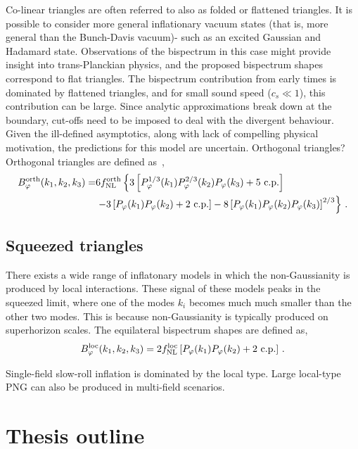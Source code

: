 Co-linear triangles are often referred to also as folded or flattened triangles. It is possible to consider more general inflationary vacuum states (that is, more general than the Bunch-Davis vacuum)- such as an excited Gaussian and Hadamard state. Observations of the bispectrum in this case might provide insight into trans-Planckian physics, and the proposed bispectrum shapes correspond to flat triangles. 
The bispectrum contribution from early times is dominated by flattened triangles, and for small sound speed ($c_s \ll 1$), this contribution can be large. Since analytic approximations break down at the boundary, cut-offs need to be imposed to deal with the divergent behaviour. Given the ill-defined asymptotics, along with lack of compelling physical motivation, the predictions for this model are uncertain.
Orthogonal triangles?~\cite{Senatore:2009gt}
Orthogonal triangles are defined as~\cite{Karagiannis:2018jdt}, 
\begin{align}
	B_\varphi^\mathrm{orth}(k_1,k_2,k_3) =& 6 \fnl^\mathrm{orth} \left\{ \vphantom{\left[ P_\varphi \right]^{1/3}} 3 \left[ P_\varphi^{1/3}(k_1) P_\varphi^{2/3}(k_2) P_\varphi(k_3) + 5\text{ c.p.} \right]  \right. \nonumber \\
	&\left. - 3 \left[ P_\varphi(k_1) P_\varphi(k_2) + 2\text{ c.p.} \right] - 8 \left[ P_\varphi(k_1) P_\varphi(k_2) P_\varphi(k_3) \right]^{2/3} \right\}\,.
\end{align}


\subsection{Squeezed triangles}

There exists a wide range of inflatonary models in which the non-Gaussianity is produced by local interactions. These signal of these models peaks in the squeezed limit, where one of the modes $k_i$ becomes much much smaller than the other two modes. This is because non-Gaussianity is typically produced on superhorizon scales. The equilateral bispectrum shapes are defined as, 
\begin{equation}
	B_\varphi^\mathrm{loc}(k_1,k_2,k_3) = 2 f_\text{NL}^\mathrm{loc} \left[ P_\varphi(k_1) P_\varphi(k_2) + 2\text{ c.p.} \right]\,.
\end{equation}

Single-field slow-roll inflation is dominated by the local type. Large local-type PNG can also be produced in multi-field scenarios. 

\section{Thesis outline}

